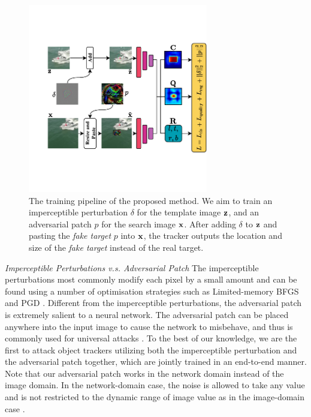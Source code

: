 \documentclass[journal]{IEEEtran}
\begin{document}
\begin{figure}[t]
  \centering
  \includegraphics[width=0.7\textwidth]{images/network_v5.pdf}
  \caption{The training pipeline of the proposed method. We aim to train an imperceptible perturbation $\delta$ for the template image $\textbf z$, and an adversarial patch $p$ for the search image $\textbf x$. After adding $\delta$ to $\textbf z$ and pasting the \textit{fake target} $p$ into $\textbf x$, the tracker outputs the location and size of the \textit{fake target} instead of the real target.}
  \label{fig:net}
\end{figure}

\textit{Imperceptible Perturbations v.s. Adversarial Patch} The imperceptible perturbations most commonly modify each pixel by a small amount and can be found using a number of optimisation strategies such as Limited-memory BFGS \cite{intriguing} and PGD \cite{PGD}.
Different from the imperceptible perturbations, the adversarial patch is extremely salient to a neural network. The adversarial patch can be placed anywhere into the input image to cause the network to misbehave, and thus is commonly used for universal attacks \cite{patch}.
To the best of our knowledge, we are the first to attack object trackers utilizing both the imperceptible perturbation and the adversarial patch together, which are jointly trained in an end-to-end manner.
Note that our adversarial patch works in the network domain instead of the image domain. In the network-domain case, the noise is allowed to take any value and is not restricted to the dynamic range of image value as in the image-domain case \cite{karmon2018lavan}.
\end{document}
